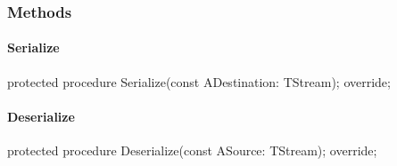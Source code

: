 \documentclass{report}
\newif\ifpdf
\begin{document}
\subsubsection*{\large{\textbf{Methods}}\normalsize\hspace{1ex}\hfill}
\paragraph*{Serialize}\hspace*{\fill}

\label{PasDoc_Items.TPasUnit-Serialize}
\begin{list}{}{
\setlength{\itemindent}{0cm}
\setlength{\listparindent}{0cm}
\setlength{\leftmargin}{\evensidemargin}
\addtolength{\leftmargin}{\tmplength}
\settowidth{\labelsep}{X}
\addtolength{\leftmargin}{\labelsep}
\setlength{\labelwidth}{\tmplength}
}
\item[\textbf{Declaration}\hfill]
\ifpdf
\begin{flushleft}
\fi
\begin{ttfamily}
protected procedure Serialize(const ADestination: TStream); override;\end{ttfamily}

\ifpdf
\end{flushleft}
\fi

\end{list}
\paragraph*{Deserialize}\hspace*{\fill}

\label{PasDoc_Items.TPasUnit-Deserialize}
\begin{list}{}{
\setlength{\itemindent}{0cm}
\setlength{\listparindent}{0cm}
\setlength{\leftmargin}{\evensidemargin}
\addtolength{\leftmargin}{\tmplength}
\settowidth{\labelsep}{X}
\addtolength{\leftmargin}{\labelsep}
\setlength{\labelwidth}{\tmplength}
}
\item[\textbf{Declaration}\hfill]
\ifpdf
\begin{flushleft}
\fi
\begin{ttfamily}
protected procedure Deserialize(const ASource: TStream); override;\end{ttfamily}

\ifpdf
\end{flushleft}
\fi

\end{list}
\end{document}
